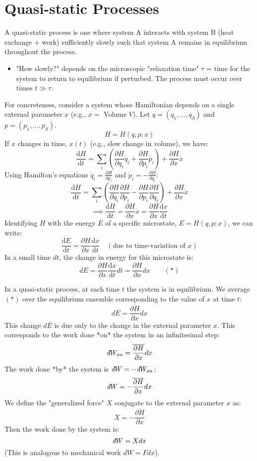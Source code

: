\documentclass[11pt]{article}
\newcommand{\avg}[1]{\overline{#1}}
\newcommand{\pderiv}[2]{\frac{\partial #1}{\partial #2}}
\newcommand{\deriv}[2]{\frac{\mathrm{d} #1}{\mathrm{d} #2}}
\newcommand{\ethbar}{\text{\it{đ}}} %
\begin{document}
\section*{Quasi-static Processes}

A quasi-static process is one where system A interacts with system B (heat exchange + work) sufficiently slowly such that system A remains in equilibrium throughout the process.
\begin{itemize}
    \item "How slowly?" depends on the microscopic "relaxation time" $\tau$ = time for the system to return to equilibrium if perturbed. The process must occur over times $t \gg \tau$.
\end{itemize}

For concreteness, consider a system whose Hamiltonian depends on a single external parameter $x$ (e.g., $x=$ Volume $V$). Let $q=(q_1, \dots, q_S)$ and $p=(p_1, \dots, p_S)$.
\[ H = H(q, p; x) \]
If $x$ changes in time, $x(t)$ (e.g., slow change in volume), we have:
\[ \deriv{H}{t} = \sum_i \left( \pderiv{H}{q_i} \dot{q}_i + \pderiv{H}{p_i} \dot{p}_i \right) + \pderiv{H}{x} \dot{x} \]
Using Hamilton's equations $\dot{q}_i = \pderiv{H}{p_i}$ and $\dot{p}_i = -\pderiv{H}{q_i}$:
\[ \deriv{H}{t} = \sum_i \left( \pderiv{H}{q_i} \pderiv{H}{p_i} - \pderiv{H}{p_i} \pderiv{H}{q_i} \right) + \pderiv{H}{x} \dot{x} \]
\[ \implies \deriv{H}{t} = \pderiv{H}{x} \dot{x} = \pderiv{H}{x} \deriv{x}{t} \]
Identifying $H$ with the energy $E$ of a specific microstate, $E = H(q,p;x)$, we can write:
\[ \deriv{E}{t} = \pderiv{H}{x} \deriv{x}{t} \quad (\text{due to time-variation of } x) \]
In a small time $dt$, the change in energy for this microstate is:
\[ dE = \pderiv{H}{x} \deriv{x}{t} dt = \pderiv{H}{x} dx \qquad (*) \]

In a quasi-static process, at each time $t$ the system is in equilibrium. We average $(*)$ over the equilibrium ensemble corresponding to the value of $x$ at time $t$:
\[ d\avg{E} = \avg{\pderiv{H}{x}} dx \]
This change $d\avg{E}$ is due only to the change in the external parameter $x$. This corresponds to the work done *on* the system in an infinitesimal step:
\[ \ethbar W_{on} = \avg{\pderiv{H}{x}} dx \]
The work done *by* the system is $\ethbar W = - \ethbar W_{on}$:
\[ \ethbar W = - \avg{\pderiv{H}{x}} dx \]
We define the "generalized force" $X$ conjugate to the external parameter $x$ as:
\[ X = - \avg{\pderiv{H}{x}} \]
Then the work done by the system is:
\[ \ethbar W = X dx \]
(This is analogous to mechanical work $dW = F dx$).
\end{document}
